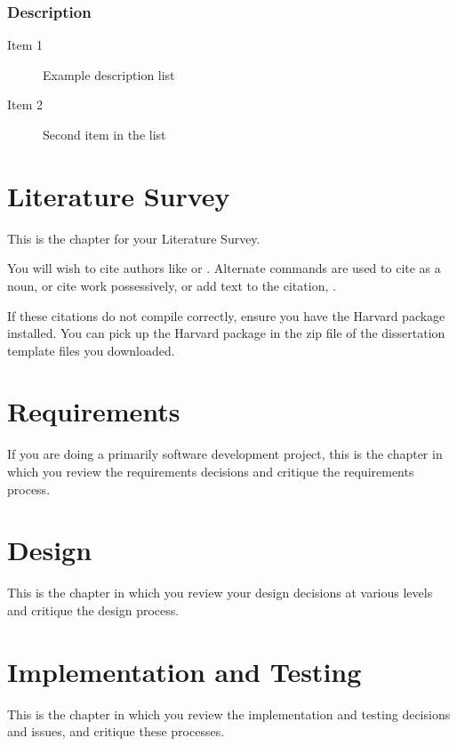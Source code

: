\documentclass[11pt,openright,twoside,a4paper]{report}
\begin{document}
\subsection{Description}

\begin{description}
\item[Item 1] Example description list
\item[Item 2] Second item in the list
\end{description}


\chapter{Literature Survey}
%
This is the chapter for your Literature Survey.

You will wish to cite authors like \cite{latex} or \cite{btxdoc}.  Alternate
commands are used to cite  as a noun, or cite
 work possessively, or add text to the citation,
.

If these citations do not compile correctly, ensure you have the Harvard
package installed.  You can pick up the Harvard package in the zip file
of the dissertation template files you downloaded.



\chapter{Requirements}
If you are doing a primarily software development project, this is the
chapter in which you review the requirements decisions and
critique the requirements process.


\chapter{Design}
This is the chapter in which you review your design decisions at various
levels and critique the design process.


\chapter{Implementation and Testing}
This is the chapter in which you review the implementation and testing
decisions and issues, and critique these processes.
\end{document}
